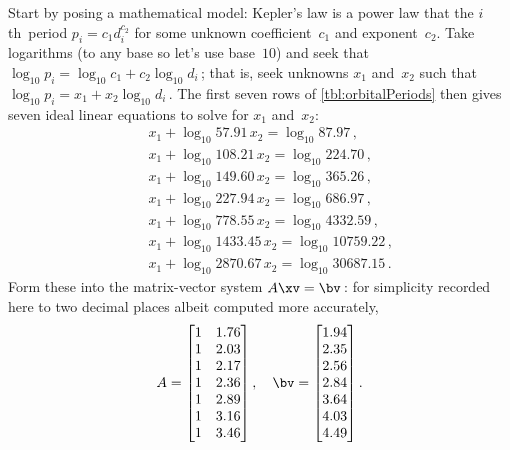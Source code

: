 \begin{example}
\begin{solution}
Start by posing a mathematical model: Kepler's law is a power law that the \(i\)th~period \(p_i=c_1d_i^{c_2}\) for some unknown coefficient~\(c_1\) and exponent~\(c_2\).  
Take logarithms (to any base so let's use base~\(10\)) and seek that 
\(\log_{10}p_i=\log_{10} c_1+c_2\log_{10}d_i\)\,; that is, seek unknowns \(x_1\) and~\(x_2\) such that \(\log_{10}p_i=x_1+x_2\log_{10}d_i\)\,.
The first seven rows of \cref{tbl:orbitalPeriods} then gives seven ideal linear equations to solve for \(x_1\) and~\(x_2\):
\begin{eqnarray*}
&&x_1+\log_{10}57.91\,x_2=\log_{10}87.97\,, %
\\&&x_1+\log_{10}108.21\,x_2=\log_{10}224.70\,, %
\\&&x_1+\log_{10}149.60\,x_2=\log_{10}365.26\,, %
\\&&x_1+\log_{10}227.94\,x_2=\log_{10}686.97\,, %
\\&&x_1+\log_{10}778.55\,x_2=\log_{10}4332.59\,, %
\\&&x_1+\log_{10}1433.45\,x_2=\log_{10}10759.22\,, %
\\&&x_1+\log_{10}2870.67\,x_2=\log_{10}30687.15\,. %
\end{eqnarray*}
Form these into the matrix-vector system \(A\xv=\bv\)\,:
for simplicity recorded here to two decimal places albeit computed more accurately,
\begin{equation*}
A= \begin{bmatrix}   1&1.76\\
   1&2.03\\
   1&2.17\\
   1&2.36\\
   1&2.89\\
   1&3.16\\
   1&3.46
 \end{bmatrix},
\quad \bv=\begin{bmatrix}   1.94\\
   2.35\\
   2.56\\
   2.84\\
   3.64\\
   4.03\\
   4.49
\end{bmatrix}.
\end{equation*}


\end{solution}
\end{example}
